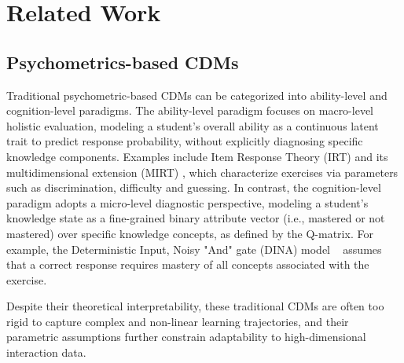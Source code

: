 \documentclass[a4paper,runningheads]{llncs}
\begin{document}
\section{Related Work}

\subsection{Psychometrics-based CDMs}
Traditional psychometric-based CDMs can be categorized into ability-level and cognition-level paradigms. The ability-level paradigm focuses on macro-level holistic evaluation, modeling a student's overall ability as a continuous latent trait to predict response probability, without explicitly diagnosing specific knowledge components. Examples include Item Response Theory (IRT) \cite{fan1998item} and its multidimensional extension (MIRT) \cite{reckase2009multidimensional}, which characterize exercises via parameters such as discrimination, difficulty and guessing. In contrast, the cognition-level paradigm adopts a micro-level diagnostic perspective, modeling a student's knowledge state as a fine-grained binary attribute vector (i.e., mastered or not mastered) over specific knowledge concepts, as defined by the Q-matrix. For example, the Deterministic Input, Noisy "And" gate (DINA) model ~\cite{delatorre2009dina,delatorre2011generalized} assumes that a correct response requires mastery of all concepts associated with the exercise.

Despite their theoretical interpretability, these traditional CDMs are often too rigid to capture complex and non-linear learning trajectories, and their parametric assumptions further constrain adaptability to high-dimensional interaction data.

\end{document}
